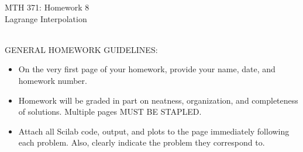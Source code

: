 \documentclass[addpoints, 11pt]{exam}
\begin{document}
\vspace{100mm}
\begin{center} \Large
MTH 371: Homework 8 \\ Lagrange Interpolation \normalsize
\end{center}
\ \\
\noindent GENERAL HOMEWORK GUIDELINES: 
\begin{itemize}
\item On the very first page of your homework, provide your name, date, and homework number.\vspace{-2mm}
\item Homework will be graded in part on neatness, organization, and completeness of solutions. Multiple pages MUST BE STAPLED. \vspace{-2mm}
\item Attach all Scilab code, output, and plots to the page immediately following each problem. Also, clearly indicate the problem they correspond to.
\end{itemize}
\end{document}
